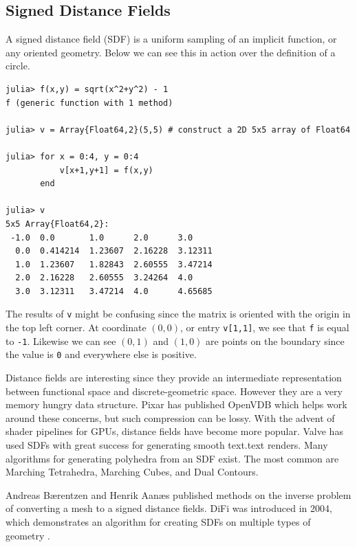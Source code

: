 \documentclass[a4paper]{article}
\begin{document}
\subsection{Signed Distance Fields}

A signed distance field (SDF) is a uniform sampling of an implicit function,
or any oriented geometry. 
Below
we can see this in action over the definition of a circle.

\begin{lstlisting}
julia> f(x,y) = sqrt(x^2+y^2) - 1
f (generic function with 1 method)

julia> v = Array{Float64,2}(5,5) # construct a 2D 5x5 array of Float64

julia> for x = 0:4, y = 0:4
           v[x+1,y+1] = f(x,y)
       end

julia> v
5x5 Array{Float64,2}:
 -1.0  0.0       1.0      2.0      3.0    
  0.0  0.414214  1.23607  2.16228  3.12311
  1.0  1.23607   1.82843  2.60555  3.47214
  2.0  2.16228   2.60555  3.24264  4.0    
  3.0  3.12311   3.47214  4.0      4.65685
\end{lstlisting}

The results of \texttt{v} might be confusing since the matrix is oriented with
the origin in the top left corner. At coordinate $(0,0)$, or entry \texttt{v[1,1]},
we see that \texttt{f} is
equal to \texttt{-1}. Likewise we can see $(0,1)$ and $(1,0)$ are points on
the boundary since the value is \texttt{0} and everywhere else is positive.

Distance fields are interesting since they provide an intermediate representation
between functional space and discrete-geometric space. However they are
a very memory hungry data structure. Pixar has published OpenVDB which helps
work around these concerns, but such compression can be lossy.\cite{OpenVDB}
With the advent of shader pipelines for GPUs, distance fields have become
more popular. Valve has used SDFs with great success for generating smooth
text.text renders. \cite{Green_2007}
Many algorithms for generating polyhedra from an SDF
exist. The most common are Marching Tetrahedra, Marching Cubes,
and Dual Contours.\cite{Muller_Wehle_1997}\cite{Newman_Yi_2006}\cite{Cook_Hourvitz}


Andreas Bærentzen and Henrik Aanæs published methods on the inverse
problem of converting a mesh to a signed distance fields.\cite{Baerentzen_Aanaes}
DiFi was introduced in 2004, which demonstrates an algorithm for creating
SDFs on multiple types of geometry \cite{Sud_Otaduy_Manocha_2004}.
\end{document}
